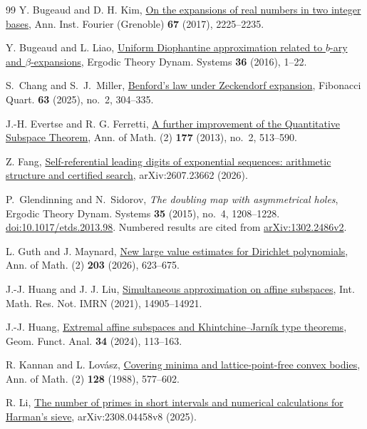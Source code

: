 \documentclass[11pt,reqno,a4paper]{amsart}
\theoremstyle{remark}
\begin{document}
\begin{thebibliography}{99}
Y. Bugeaud and D. H. Kim,
\href{https://doi.org/10.5802/aif.3134}{On the expansions of real numbers in two integer bases},
Ann. Inst. Fourier (Grenoble) \textbf{67} (2017), 2225--2235.

Y. Bugeaud and L. Liao,
\href{https://doi.org/10.1017/etds.2014.66}{Uniform Diophantine approximation related to \(b\)-ary and \(\beta\)-expansions},
Ergodic Theory Dynam. Systems \textbf{36} (2016), 1--22.

S.~Chang and S.~J.~Miller,
\href{https://arxiv.org/abs/2309.00090}{Benford's law under Zeckendorf expansion},
Fibonacci Quart. \textbf{63} (2025), no.~2, 304--335.

J.-H. Evertse and R. G. Ferretti,
\href{https://annals.math.princeton.edu/2013/177-2/p04}{A further improvement of the Quantitative Subspace Theorem},
Ann. of Math. (2) \textbf{177} (2013), no.~2, 513--590.

Z. Fang,
\href{https://arxiv.org/abs/2607.23662}{Self-referential leading digits of exponential sequences: arithmetic structure and certified search},
arXiv:2607.23662 (2026).

P.~Glendinning and N.~Sidorov, \emph{The doubling map with asymmetrical
holes}, Ergodic Theory Dynam. Systems \textbf{35} (2015), no.~4,
1208--1228.
\href{https://doi.org/10.1017/etds.2013.98}{doi:10.1017/etds.2013.98}.
Numbered results are cited from \href{https://arxiv.org/abs/1302.2486v2}
{arXiv:1302.2486v2}.

L. Guth and J. Maynard,
\href{https://doi.org/10.4007/annals.2026.203.2.6}{New large value estimates for Dirichlet polynomials}, Ann. of Math. (2) \textbf{203} (2026), 623--675.

J.-J. Huang and J. J. Liu,
\href{https://doi.org/10.1093/imrn/rnz190}{Simultaneous approximation on affine subspaces},
Int. Math. Res. Not. IMRN (2021), 14905--14921.

J.-J. Huang,
\href{https://doi.org/10.1007/s00039-024-00665-y}{Extremal affine subspaces and Khintchine--Jarn\'ik type theorems},
Geom. Funct. Anal. \textbf{34} (2024), 113--163.

R. Kannan and L. Lov\'asz,
\href{https://doi.org/10.2307/1971436}{Covering minima and lattice-point-free convex bodies},
Ann. of Math. (2) \textbf{128} (1988), 577--602.

R. Li, \href{https://arxiv.org/abs/2308.04458v8}{The number of primes in short intervals and numerical calculations for Harman's sieve}, arXiv:2308.04458v8 (2025).


\end{thebibliography}
\end{document}
